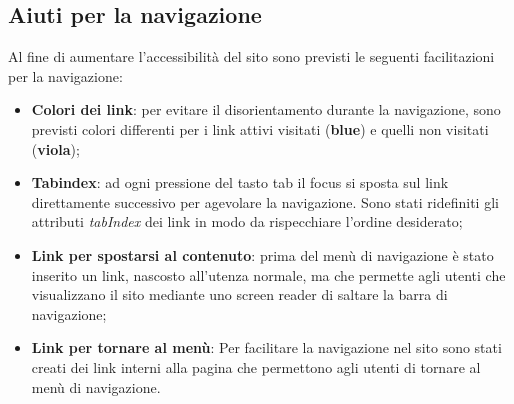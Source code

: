 	\subsection{Aiuti per la navigazione}
	Al fine di aumentare l'accessibilità del sito sono previsti le seguenti facilitazioni per la navigazione:
	\begin{itemize}
		\item \textbf{Colori dei link}: per evitare il disorientamento durante la navigazione, sono previsti colori differenti per i link attivi visitati (\textbf{blue}) e quelli non visitati (\textbf{viola});
		\item \textbf{Tabindex}: ad ogni pressione del tasto tab il focus si sposta sul link direttamente successivo per agevolare la navigazione. Sono stati ridefiniti gli attributi \textit{tabIndex} dei link in modo da rispecchiare l'ordine desiderato;
		\item \textbf{Link per spostarsi al contenuto}: prima del menù di navigazione è stato inserito un link, nascosto all'utenza normale, ma che permette agli utenti che visualizzano il sito mediante uno screen reader di saltare la barra di navigazione;
		\item \textbf{Link per tornare al menù}: Per facilitare la navigazione nel sito sono stati creati dei link interni alla pagina che permettono agli utenti di tornare al menù di navigazione.
	\end{itemize}
	



